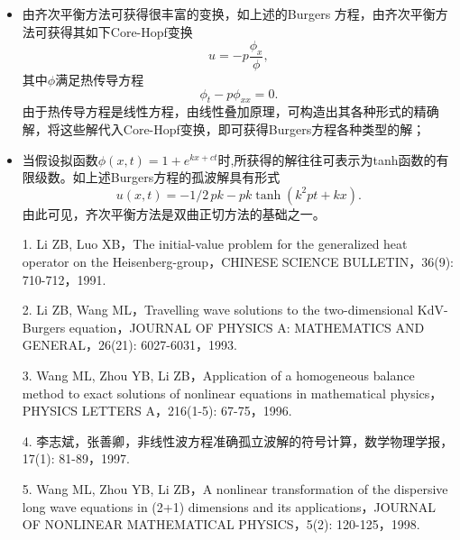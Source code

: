 \documentclass{beamer}
\begin{document}
\begin{frame}    
  \begin{itemize}  
    \item 由齐次平衡方法可获得很丰富的变换，如上述的Burgers 方程，由齐次平衡方法可获得其如下Core-Hopf变换
      \[
        u=-p\dfrac{\phi_x}{\phi},
      \]
      其中$\phi$满足热传导方程
      \[
        \phi_t-p\phi_{xx}=0.
      \]
     由于热传导方程是线性方程，由线性叠加原理，可构造出其各种形式的精确解，将这些解代入Core-Hopf变换，即可获得Burgers方程各种类型的解；
    \item 当假设拟函数$\phi(x,t)=1+e^{kx+ct}$时,所获得的解往往可表示为tanh函数的有限级数。如上述Burgers方程的孤波解具有形式
   \[
     u \left( x,t \right) =-1/2\,pk-pk\tanh \left( {k}^{2}pt+kx \right).\]
  由此可见，齐次平衡方法是双曲正切方法的基础之一。 
   \end{itemize}
\end{frame}
\begin{frame}
  \begin{itemize}
    \item[1.] Li ZB, Luo XB，The initial-value problem for the generalized heat operator on the Heisenberg-group，CHINESE SCIENCE BULLETIN，36(9): 710-712，1991.
    \item[2.] Li ZB, Wang ML，Travelling wave solutions to the two-dimensional KdV-Burgers equation，JOURNAL OF PHYSICS A: MATHEMATICS AND GENERAL，26(21): 6027-6031，1993.
    \item[3.] Wang ML, Zhou YB, Li ZB，Application of a homogeneous balance method to exact solutions of nonlinear equations in mathematical physics，PHYSICS LETTERS A，216(1-5): 67-75，1996.
    \item [4.]李志斌，张善卿，非线性波方程准确孤立波解的符号计算，数学物理学报，17(1): 81-89，1997.
    \item[5.] Wang ML, Zhou YB, Li ZB，A nonlinear transformation of the dispersive long wave equations in (2+1) dimensions and its applications，JOURNAL OF NONLINEAR MATHEMATICAL PHYSICS，5(2): 120-125，1998.
  \end{itemize}
\end{frame}
\end{document}
